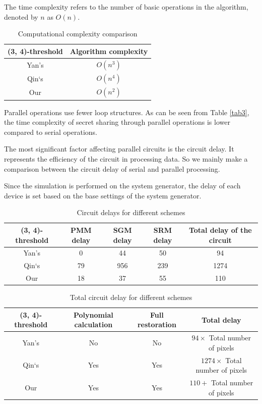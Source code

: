The time complexity refers to the number of basic operations in the algorithm, denoted by $n$ as $O(n)$.

\begin{table}[!htb]
	\caption{Computational complexity comparison}\label{tab3}
	\label{1111}    
	\begin{tabular}{cc}
		\toprule
		(3, 4)-threshold&Algorithm complexity\\
		\midrule
		Yan’s\cite{xing2022information}&$O(n^{3} )$\\
		Qin‘s\cite{qin2021reversible}&$O(n^{4} )$\\
		Our&$O(n^{2} )$\\
		\bottomrule
	\end{tabular}
\end{table}

Parallel operations use fewer loop structures. As can be seen from Table \ref{tab3}, the time complexity of secret sharing through parallel operations is lower compared to serial operations.

The most significant factor affecting parallel circuits is the circuit delay. It represents the efficiency of the circuit in processing data. So we mainly make a comparison between the circuit delay of serial and parallel processing.

Since the simulation is performed on the system generator, the delay of each device is set based on the base settings of the system generator.

\begin{table}[!htb]
	\begin{center}
	\caption{Circuit delays for different schemes}\label{tab4}
	\begin{tabular}{ccccc}
		\toprule
		(3, 4)-threshold&PMM delay&SGM delay&SRM delay&Total delay of the circuit\\
		\midrule
		Yan’s\cite{xing2022information}&0&44&50&94\\
		Qin‘s\cite{qin2021reversible}&79&956&239&1274\\
		Our&18&37&55&110\\
		\bottomrule
	\end{tabular}
	\end{center}
\end{table}

\begin{table}[!htb]
		\begin{center}
	\caption{Total circuit delay for different schemes}\label{tab5}
	\label{1111}    
	\begin{tabular}{cccc}
		\toprule
		(3, 4)-threshold&Polynomial calculation&Full restoration&Total delay\\
		\midrule
		Yan’s\cite{xing2022information}&No&No&$94 \times$ Total number of pixels\\
		Qin‘s\cite{qin2021reversible}&Yes&Yes&$1274\times$ Total number of pixels\\
		Our&Yes&Yes&$110+$  Total number of pixels\\
		\bottomrule
	\end{tabular}
	\end{center}
\end{table}

